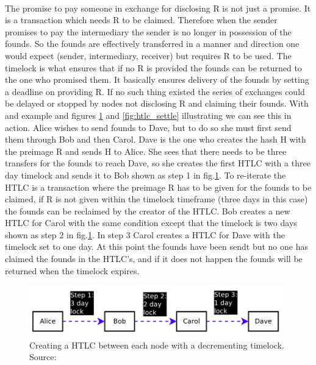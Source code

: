 \documentclass[informationsecurity]{gucmasterproject}
\begin{document}
\paragraph{}
The promise to pay someone in exchange for disclosing R is not just a promise. It is a transaction which needs R to be claimed. Therefore when the sender promises to pay the intermediary the sender is no longer in possession of the founds. So the founds are effectively transferred in a manner and direction one would expect (sender, intermediary, receiver) but requires R to be used. The timelock is what ensures that if no R is provided the founds can be returned to the one who promised them. It basically ensures delivery of the founds by setting a deadline on providing R. If no such thing existed the series of exchanges could be delayed or stopped by nodes not disclosing R and claiming their founds.
With and example and figures \ref{fig:htlc_promise} and \ref{fig:htlc_settle} illustrating we can see this in action.
Alice wishes to send founds to Dave, but to do so she must first send them through Bob and then Carol. Dave is the one who creates the hash H with the preimage R and sends H to Alice. She sees that there needs to be three transfers for the founds to reach Dave, so she creates the first HTLC with a three day timelock and sends it to Bob shown as step 1 in fig.\ref{fig:htlc_promise}. To re-iterate the HTLC is a transaction where the preimage R has to be given for the founds to be claimed, if R is not given within the timelock timeframe (three days in this case) the founds can be reclaimed by the creator of the HTLC. Bob creates a new HTLC for Carol with the same condition except that the timelock is two days shown as step 2 in fig.\ref{fig:htlc_promise}. In step 3 Carol creates a HTLC for Dave with the timelock set to one day. At this point the founds have been sendt but no one has claimed the founds in the HTLC's, and if it does not happen the founds will be returned when the timelock expires.

\begin{figure}[h]
    \centering
    \includegraphics[width=11cm]{figs/htlc_promise.png}
    \caption{ Creating a HTLC between each node with a decrementing timelock. Source: \cite{poon2015bitcoin}}
    \label{fig:htlc_promise}
\end{figure}
\end{document}
